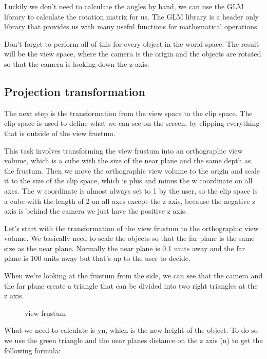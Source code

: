 \documentclass[12pt]{report} \usepackage{preamble}
\begin{document}
Luckily we don't need to calculate the angles by hand, we can use the
\ac{GLM} library to calculate the rotation matrix for us. The \ac{GLM} library is a
header only library that provides us with many useful functions for
mathematical operations.

Don't forget to perform all of this for every object in the world space.
The result will be the view space, where the camera is the origin and
the objects are rotated so that the camera is looking down the z axis.

\subsection{Projection transformation}

The next step is the transformation from the view space to the clip
space. The clip space is used to define what we can see
on the screen, by clipping everything that is outside of the view frustum.

This task involves transforming the view frustum into an orthographic view
volume, which is a cube with the size of the near plane and the same depth
as the frustum. Then we move the orthographic view volume to the origin
and scale it to the size of the clip space, which is plus and minus the
w coordinate on all axes. The w coordinate is almost always set to 1 by the user,
so the clip space is a cube with the length of 2 on all axes except the z axis,
because the negative z axis is behind the camera we just have the positive
z axis.

Let's start with the transformation of the view frustum to the orthographic
view volume. We basically need to scale the objects so that the far plane is
the same size as the near plane. Normally the near plane is 0.1 units away and the far
plane is 100 units away but that's up to the user to decide.

When we're looking at the frustum from the side, we can see that the camera and
the far plane create a triangle that can be divided into two right triangles at the
z axis.

\begin{figure}[hbtp]
	\centering 
	\caption{view frustum}
\end{figure} \Floatbarrier

What we need to calculate is yn, which is the new height of the object.
To do so we use the green triangle and the near planes distance on the z axis
(n) to get the following formula:
\end{document}
